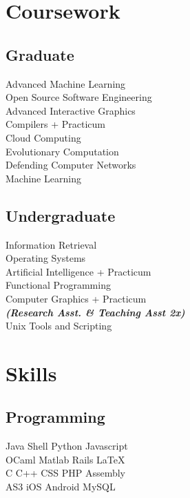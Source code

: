 \documentclass[]{deedy-resume-openfont}
\begin{document}
\begin{minipage}[t]{0.33\textwidth}

\section{Coursework}
\subsection{Graduate}
Advanced Machine Learning \\
Open Source Software Engineering \\
Advanced Interactive Graphics \\
Compilers + Practicum \\
Cloud Computing \\
Evolutionary Computation \\
Defending Computer Networks \\
Machine Learning \\
\sectionsep

\subsection{Undergraduate}
Information Retrieval \\
Operating Systems \\
Artificial Intelligence + Practicum \\
Functional Programming \\
Computer Graphics + Practicum \\
{\footnotesize \textit{\textbf{(Research Asst. \& Teaching Asst 2x) }}} \\
Unix Tools and Scripting \\


\section{Skills}
\subsection{Programming}
Java \textbullet{}   Shell \textbullet{} Python \textbullet{} Javascript \\
OCaml \textbullet{} Matlab \textbullet{} Rails \textbullet{} \LaTeX\ \\
C \textbullet{} C++ \textbullet{} CSS \textbullet{} PHP \textbullet{} Assembly \\
AS3 \textbullet{} iOS \textbullet{} Android \textbullet{} MySQL
\sectionsep

%
%

\end{minipage}
\end{document}
